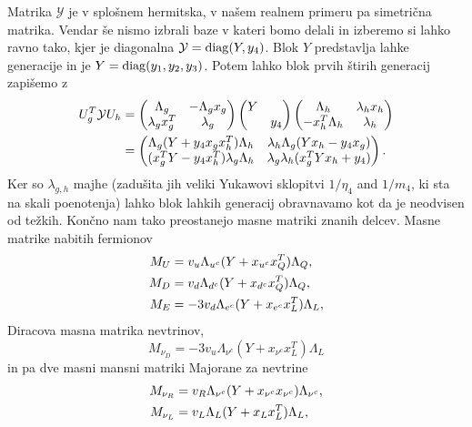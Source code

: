 Matrika $\mathcal{Y}$ je v splošnem hermitska, v našem realnem primeru pa simetrična matrika.
Vendar še nismo izbrali baze v kateri bomo delali in izberemo si lahko ravno tako, kjer je
diagonalna $\mathcal{Y} = \operatorname{diag} (Y, y_4)$. Blok $Y$ predstavlja lahke generacije in je
$Y = \operatorname{diag} (y_1, y_2, y_3)$. Potem lahko blok prvih štirih generacij zapišemo z
\begin{align}
	U_g^T \mathcal{Y} U_h &= \begin{pmatrix}
		\Lambda_g & - \Lambda_g x_g \\ \lambda_g x_g^T & \lambda_g
	\end{pmatrix} \begin{pmatrix}
		Y & \\ & y_4
	\end{pmatrix} \begin{pmatrix}
		\Lambda_h & \lambda_h x_h \\ -x_h^T \Lambda_h & \lambda_h
	\end{pmatrix} \notag \\
	&= \begin{pmatrix}
		\Lambda_g (Y + y_4 x_g x_h^T) \Lambda_h & \lambda_h\Lambda_g(Y x_h - y_4 x_g) \\
		(x_g^T Y - y_4 x_h^T) \lambda_g\Lambda_h & \lambda_g \lambda_h(x_g^T Y x_h + y_4)
	\end{pmatrix}.
\end{align}
Ker so $\lambda_{g,h}$ majhe (zadušita jih veliki Yukawovi sklopitvi $1/\eta_4$ and $1/m_4$, ki sta
na skali poenotenja) lahko blok lahkih generacij obravnavamo kot da je neodvisen od težkih. Končno
nam tako preostanejo masne matriki znanih delcev. Masne matrike nabitih fermionov
\begin{align}
	M_U &= v_u \Lambda_{u^c} (Y + x_{u^c} x_Q^T) \Lambda_Q, \notag \\
	M_D &= v_d \Lambda_{d^c} (Y + x_{d^c} x_Q^T) \Lambda_Q, \notag \\
	M_E &= -3v_d \Lambda_{e^c} (Y + x_{e^c} x_L^T) \Lambda_L,
\end{align}
Diracova masna matrika nevtrinov,
\begin{equation}
	M_{\nu_D} = -3v_u \Lambda_{\nu^c} (Y + x_{\nu^c} x_L^T) \Lambda_L
\end{equation}
in pa dve masni mansni matriki Majorane za nevtrine
\begin{align}
	M_{\nu_R} &= v_R \Lambda_{\nu^c} (Y + x_{\nu^c} x_{\nu^c}) \Lambda_{\nu^c}, \notag \\
	M_{\nu_L} &= v_L \Lambda_L (Y + x_L x_L^T) \Lambda_L,
\end{align}
